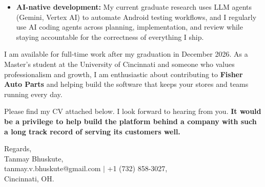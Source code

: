 \documentclass[11pt]{letter}
\begin{document}
\begin{letter}{}
\begin{itemize}[leftmargin=*, itemsep=0.45em]
    \item \textbf{AI-native development:} My current graduate research uses LLM agents (Gemini, Vertex AI) to automate Android testing workflows, and I regularly use AI coding agents across planning, implementation, and review while staying accountable for the correctness of everything I ship.
\end{itemize}

I am available for full-time work after my graduation in December 2026. As a Master's student at the University of Cincinnati and someone who values professionalism and growth, I am enthusiastic about contributing to \textbf{Fisher Auto Parts} and helping build the software that keeps your stores and teams running every day.

Please find my CV attached below. I look forward to hearing from you. \textbf{It would be a privilege to help build the platform behind a company with such a long track record of serving its customers well.}

{\setlength{\parskip}{0pt}
Regards,\\
Tanmay Bhuskute,\\
tanmay.v.bhuskute@gmail.com $\mid$ +1 (732) 858-3027,\\
Cincinnati, OH.
}

\end{letter}
\end{document}
